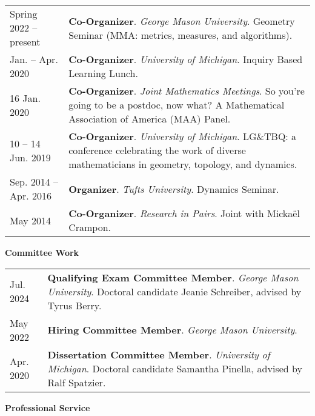     \begin{center}
    {
    \renewcommand{\arraystretch}{1.2}
    \begin{longtable}{p{}  p{}}
      Spring 2022 --    present & \textbf{Co-Organizer}. \textit{George Mason University}.  Geometry Seminar (MMA: metrics, measures, and algorithms).  \\ 
 Jan.  --  Apr.  2020 & \textbf{Co-Organizer}. \textit{University of Michigan}.  Inquiry Based Learning Lunch.  \\ 
16 Jan.  2020 & \textbf{Co-Organizer}. \textit{Joint Mathematics Meetings}.  So you're going to be a postdoc, now what? A Mathematical Association of America (MAA) Panel.  \\ 
10  -- 14 Jun.  2019 & \textbf{Co-Organizer}. \textit{University of Michigan}.  LG\&TBQ: a conference celebrating the work of diverse mathematicians
in geometry, topology, and dynamics.  \\ 
 Sep.  2014 --  Apr.  2016 & \textbf{Organizer}. \textit{Tufts University}.  Dynamics Seminar.  \\ 
 May  2014 & \textbf{Co-Organizer}. \textit{Research in Pairs}.  Joint with Micka\"el Crampon.  
    \end{longtable}
    } 
    \end{center}

    \vspace{-1em}
    

    \textbf{\large Committee Work}
    
    \begin{center}
    {
    \renewcommand{\arraystretch}{1.2}
    \begin{longtable}{p{}  p{}}
     Jul.  2024 & \textbf{Qualifying Exam Committee Member}. \textit{George Mason University}.  Doctoral candidate Jeanie Schreiber, advised by Tyrus Berry.  \\ 
 May  2022 & \textbf{Hiring Committee Member}. \textit{George Mason University}.  \\ 
 Apr.  2020 & \textbf{Dissertation Committee Member}. \textit{University of Michigan}.  Doctoral candidate Samantha Pinella, advised by Ralf Spatzier.  
    \end{longtable}
    } 
    \end{center}

    \vspace{-1em}
    

    \textbf{\large Professional Service}
    
